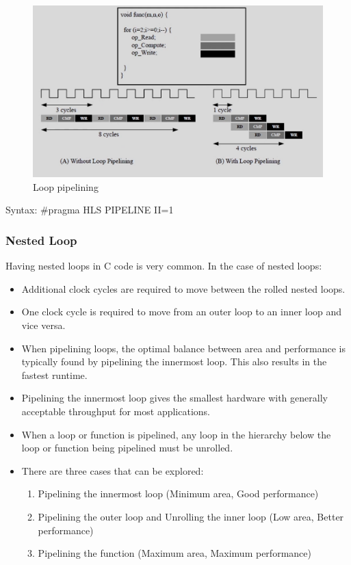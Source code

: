 \begin{figure}[H]
	\begin{center}
		\includegraphics[width=\textwidth]{images/LoopPipe.png}
		\caption{Loop pipelining}
		\label{LoopPipe}
	\end{center}
\end{figure}

Syntax: \#pragma HLS PIPELINE II=1

\subsubsection{Nested Loop}
Having nested loops in C code is very common. In the case of nested loops:
\begin{itemize}
  \item Additional clock cycles are required to move between the rolled nested loops.
  \item One clock cycle is required to move from an outer loop to an inner loop and vice versa.
  \item When pipelining loops, the optimal balance between area and performance is typically found by pipelining the innermost loop. This also results in the fastest runtime.
  \item Pipelining the innermost loop gives the smallest hardware with generally acceptable throughput for most applications.
  \item When a loop or function is pipelined, any loop in the hierarchy below the loop or function being pipelined must be unrolled.
  \item There are three cases that can be explored: 
  \begin{enumerate}
    \item Pipelining the innermost loop (Minimum area, Good performance)
    \item Pipelining the outer loop and Unrolling the inner loop  (Low area, Better performance)
    \item Pipelining the function (Maximum area, Maximum performance)
  \end{enumerate}
\end{itemize}

